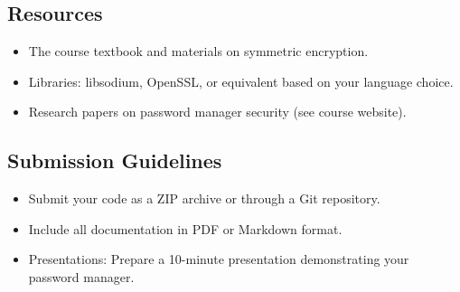 \documentclass[10pt,a4paper,american]{article}
\begin{document}
\subsection*{Resources}
\begin{itemize}
	\item The course textbook and materials on symmetric encryption.
	\item Libraries: libsodium, OpenSSL, or equivalent based on your language choice.
	\item Research papers on password manager security (see course website).
\end{itemize}

\subsection*{Submission Guidelines}
\begin{itemize}
	\item Submit your code as a ZIP archive or through a Git repository.
	\item Include all documentation in PDF or Markdown format.
	\item Presentations: Prepare a 10-minute presentation demonstrating your password manager.
\end{itemize}
\end{document}
